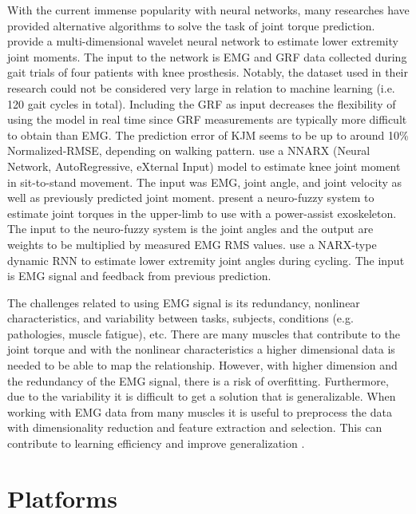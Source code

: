 \documentclass[../main.tex]{subfiles}
\begin{document}
With the current immense popularity with neural networks, many researches have provided alternative algorithms to solve the task of joint torque prediction.
\textcite{Ardestani2014} provide a multi-dimensional wavelet neural network to estimate lower extremity joint moments. 
The input to the network is \ac{EMG} and \ac{GRF} data collected during gait trials of four patients with knee prosthesis.
Notably, the dataset used in their research could not be considered very large in relation to machine learning (i.e. 120 gait cycles in total).
Including the \ac{GRF} as input decreases the flexibility of using the model in real time since \ac{GRF} measurements are typically more difficult to obtain than \ac{EMG}.
The prediction error of \ac{KJM} seems to be up to around 10\% Normalized-RMSE, depending on walking pattern.
\textcite{Lee14-1} use a NNARX (Neural Network, AutoRegressive, eXternal Input) model to estimate knee joint moment in sit-to-stand movement. 
The input was \ac{EMG}, joint angle, and joint velocity as well as previously predicted joint moment. 
\textcite{Kiguchi2012} present a neuro-fuzzy system to estimate joint torques in the upper-limb to use with a power-assist exoskeleton. 
The input to the neuro-fuzzy system is the joint angles and the output are weights to be multiplied by measured \ac{EMG} RMS values.
\textcite{Cui2016} use a NARX-type dynamic \ac{RNN} to estimate lower extremity joint angles during cycling. 
The input is \ac{EMG} signal and feedback from previous prediction.

The challenges related to using \ac{EMG} signal is its redundancy, nonlinear characteristics, and variability between tasks, subjects, conditions (e.g. pathologies, muscle fatigue), etc.
There are many muscles that contribute to the joint torque and with the nonlinear characteristics a higher dimensional data is needed to be able to map the relationship.
However, with higher dimension and the redundancy of the \ac{EMG} signal, there is a risk of overfitting.
Furthermore, due to the variability it is difficult to get a solution that is generalizable.
When working with \ac{EMG} data from many muscles it is useful to preprocess the data with dimensionality reduction and feature extraction and selection. This can contribute to learning efficiency and improve generalization \cite{Chen2018, Marsland2014}.

\section{Platforms}
\label{sec:A-Platforms}
\end{document}
